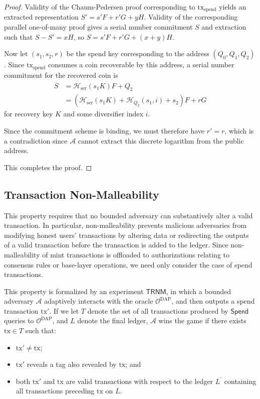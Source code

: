\documentclass{llncs}
\newcommand{\hash}{\mathcal{H}}
\newcommand{\func}[1]{\mathsf{#1}}
\begin{document}
\begin{proof}
Validity of the Chaum-Pedersen proof corresponding to $\text{tx}_{\text{spend}}$ yields an extracted representation $S' = s'F + r'G + yH$.
Validity of the corresponding parallel one-of-many proof gives a serial number commitment $S$ and extraction such that $S - S' = xH$, so $S = s'F + r'G + (x + y)H$.

Now let $(s_1,s_2,r)$ be the spend key corresponding to the address $(Q_0,Q_1,Q_2)$.
Since $\text{tx}_{\text{spend}}$ consumes a coin recoverable by this address, a serial number commitment for the recovered coin is
\begin{align*}
\overline{S} &= \hash_{\text{ser}}(s_1 K)F + Q_2 \\
&= (\hash_{\text{ser}}(s_1 K) + \hash_{Q_2}(s_1,i) + s_2)F + rG
\end{align*}
for recovery key $K$ and some diversifier index $i$.

Since the commitment scheme is binding, we must therefore have $r' = r$, which is a contradiction since $\mathcal{A}$ cannot extract this discrete logarithm from the public address.

This completes the proof.
\end{proof}


\subsection{Transaction Non-Malleability}

This property requires that no bounded adversary can substantively alter a valid transaction. 
In particular, non-malleability prevents malicious adversaries from modifying honest users' transactions by altering data or redirecting the outputs of a valid transaction before the transaction is added to the ledger.
Since non-malleability of mint transactions is offloaded to authorizations relating to consensus rules or base-layer operations, we need only consider the case of spend transactions.

This property is formalized by an experiment $\func{TRNM}$, in which a bounded adversary $\mathcal{A}$ adaptively interacts with the oracle $\mathcal{O}^{\text{DAP}}$, and then outputs a spend transaction $\text{tx}'$.
If we let $T$ denote the set of all transactions produced by $\func{Spend}$ queries to $\mathcal{O}^{\text{DAP}}$, and $L$ denote the final ledger, $\mathcal{A}$ wins the game if there exists $\text{tx} \in T$ such that:
\begin{itemize}
    \item $\text{tx}' \neq \text{tx}$; 
    \item $\text{tx}'$ reveals a tag also revealed by $\text{tx}$; and
    \item both $\text{tx}'$ and $\text{tx}$ are valid transactions with respect to the ledger $L^{\prime}$ containing all transactions preceding $\text{tx}$ on $L$.
\end{itemize}
\end{document}
